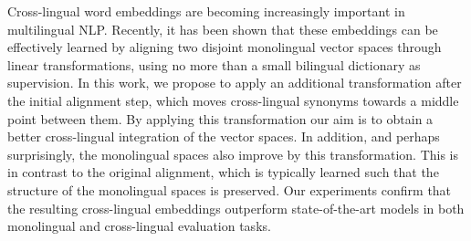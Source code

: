 Cross-lingual word embeddings are becoming increasingly important in multilingual NLP. Recently, it has been shown that these embeddings can be effectively learned by aligning two disjoint monolingual vector spaces through linear transformations, using no more than a small bilingual dictionary as supervision. In this work, we propose to apply an additional transformation after the initial alignment step, which moves cross-lingual synonyms towards a middle point between them. By applying this transformation our aim is to obtain a better cross-lingual integration of the vector spaces. In addition, and perhaps surprisingly, the monolingual spaces also improve by this transformation. This is in contrast to the original alignment, which is typically learned such that the structure of the monolingual spaces is preserved. Our experiments confirm that the resulting cross-lingual embeddings outperform state-of-the-art models in both monolingual and cross-lingual evaluation tasks.
